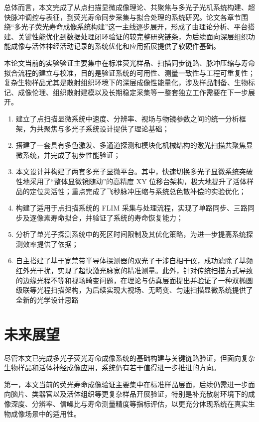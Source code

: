 总体而言，本文完成了从点扫描显微成像理论、共聚焦与多光子光机系统构建、超快脉冲调控与表征，到荧光寿命同步采集与拟合处理的系统研究。论文各章节围绕“多光子荧光寿命成像系统构建”这一主线逐步展开，形成了由理论分析、平台搭建、关键性能优化到数据处理闭环验证的较完整研究链条，为后续面向深层组织功能成像与活体神经活动记录的系统优化和应用拓展提供了软硬件基础。

本论文当前的实验验证主要集中在标准荧光样品、扫描同步链路、脉冲压缩与寿命拟合流程的建立与校准，目的是验证系统的可用性、测量一致性与工程可重复性；复杂生物样品尤其是散射组织环境下的深层成像性能量化，涉及样品制备、生物标记、成像伦理、组织散射建模以及长期稳定采集等一整套独立工作需要在下一步展开。

\begin{enumerate}
    \item 建立了点扫描显微系统中速度、分辨率、视场与物镜参数之间的统一分析框架，为共聚焦与多光子系统设计提供了理论基础；
    \item 搭建了一套具有多色激发、多通道探测和模块化机械结构的激光扫描共聚焦显微系统，并完成了初步性能验证；
    \item 本文设计并构建了两套多光子显微平台。其中，快速切换多光子显微系统突破性地采用了``整体显微镜随动''的高精度 XY 位移台架构，极大地提升了活体样品的定位灵活性；重点完成了飞秒脉冲压缩与系统总色散补偿的实验优化；
    \item 构建了适用于点扫描系统的 FLIM 采集与处理流程，实现了单路同步、三路同步及逐像素寿命拟合，并验证了系统的寿命恢复能力；
    \item 分析了单光子探测系统中的死区时间限制及其优化策略，为进一步提高系统探测效率提供了依据；
    \item 自主搭建了基于宽禁带半导体探测器的双光子干涉自相干仪，成功滤除了基频红外光干扰，实现了超快激光脉宽的精准测量。此外，针对传统扫描方式导致的边缘光程不等和视场畸变问题，在理论与仿真层面提出并验证了一种双椭圆级联等光程扫描架构，为后续实现大视场、无畸变、匀速扫描显微系统提供了全新的光学设计思路
\end{enumerate}


\section{未来展望}\label{7.2}

尽管本文已完成多光子荧光寿命成像系统的基础构建与关键链路验证，但面向复杂生物样品和活体神经成像应用，系统仍有若干值得进一步推进的方向。

第一，本文当前的荧光寿命成像验证主要集中在标准样品层面，后续仍需进一步面向脑片、类器官以及活体组织等更复杂样品开展验证，特别是补充散射环境下的成像深度、分辨率、信噪比与寿命测量精度等指标评估，以更充分体现系统在真实生物成像场景中的适用性。


